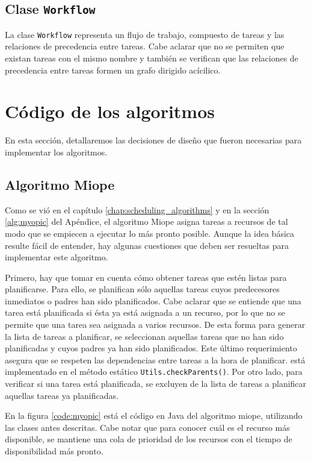 \subsection{Clase \texttt{Workflow}}
La clase \texttt{Workflow} representa un flujo de trabajo, compuesto de tareas y las relaciones de precedencia entre tareas. Cabe aclarar que no se permiten que existan tareas con el mismo nombre y también se verifican que las relaciones de precedencia entre tareas formen un grafo dirigido acícilico.

\section{Código de los algoritmos}
En esta sección, detallaremos las decisiones de diseño que fueron necesarias para implementar los algoritmos.

\subsection{Algoritmo Miope}
Como se vió en el capítulo \ref{chap:scheduling_algorithms} y en la sección \ref{alg:myopic} del Apéndice, el algoritmo Miope asigna tareas a recursos de tal modo que se empiecen a ejecutar lo más pronto posible. Aunque la idea básica resulte fácil de entender, hay algunas cuestiones que deben ser resueltas para implementar este algoritmo.

Primero, hay que tomar en cuenta cómo obtener tareas que estén listas para planificarse. Para ello, se planifican sólo aquellas tareas cuyos predecesores inmediatos o padres han sido planificados. Cabe aclarar que se entiende que una tarea está planificada si ésta ya está asignada a un recurso, por lo que no se permite que una tarea sea asignada a varios recursos.
De esta forma para generar la lista de tareas a planificar, se seleccionan aquellas tareas que no han sido planificadas y cuyos padres ya han sido planificados. Este último requerimiento asegura que se respeten las dependencias entre tareas a la hora de planificar. está implementado en el método estático \texttt{Utils.checkParents()}. Por otro lado, para verificar si una tarea está planificada, se excluyen de la lista de tareas a planificar aquellas tareas ya planificadas.

En la figura \ref{code:myopic} está el código en Java del algoritmo miope, utilizando las clases antes descritas. Cabe notar que para conocer cuál es el recurso más disponible, se mantiene una cola de prioridad de los recursos con el tiempo de disponibilidad más pronto.


